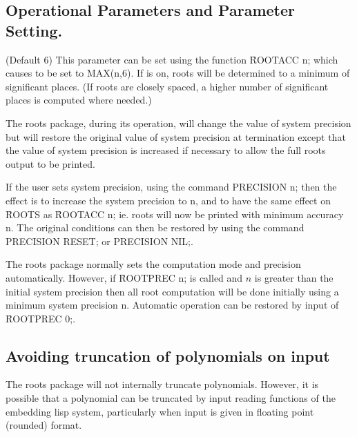 \subsection{Operational Parameters and Parameter Setting.}

\begin{description}                 
\item[ROOTACC\#] (Default 6) This parameter can be set using the function
\f{ROOTACC} n; which causes  to be set to MAX(n,6).  If  
is on, roots will be determined to a minimum of 
significant places. (If roots are closely spaced, a higher number of
significant places is computed where needed.)

\item[system precision] The roots package, during its operation, will
change the value of system precision but will restore the original value
of system precision at termination except that the value of system
precision is increased if necessary to allow the full roots output to be
printed.

\item[PRECISION n;] If the user sets system precision, using the command
PRECISION n; then the effect is to increase the system precision to n, and
to have the same effect on \f{ROOTS} as \f{ROOTACC} n; ie. roots will now be
printed with minimum accuracy n.  The original conditions can then be
restored by using the command PRECISION RESET; or PRECISION NIL;.

\item[ROOTPREC n;] The roots package normally sets the computation mode and
precision automatically.  However, if \f{ROOTPREC} n; is
called and $n$ is greater than the initial system precision then all root
computation will be done initially using a minimum system precision n.
Automatic operation can be restored by input of \f{ROOTPREC} 0;.
\end{description}


\subsection{Avoiding truncation of polynomials on input}

The roots package will not internally truncate polynomials.  However, it
is possible that a polynomial can be truncated by input reading functions
of the embedding lisp system, particularly when input is given in floating
point (rounded) format.


